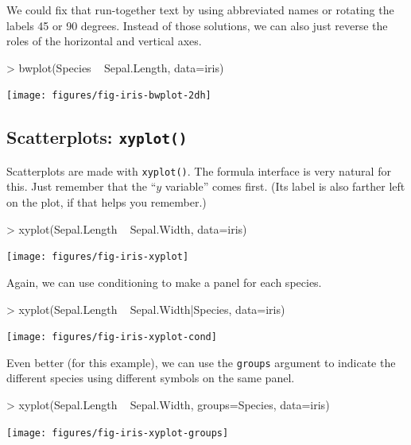 We could fix that run-together text by using abbreviated names or rotating the
labels 45 or 90 degrees.  Instead of those solutions, we can also just reverse the roles
of the horizontal and vertical axes.
\begin{center}
\begin{Schunk}
\begin{Sinput}
> bwplot(Species ~ Sepal.Length, data=iris)
\end{Sinput}
\end{Schunk}
\texttt{[image: figures/fig-iris-bwplot-2dh]}
\end{center}

\vspace{-12mm}


\subsection{Scatterplots: \texttt{xyplot()}}

Scatterplots are made with \verb!xyplot()!.  The formula interface is very natural for this.  
Just remember that the ``$y$ variable'' comes first.  (Its label is also farther left on 
the plot, if that helps you remember.)
\begin{center}
\begin{Schunk}
\begin{Sinput}
> xyplot(Sepal.Length ~ Sepal.Width, data=iris)
\end{Sinput}
\end{Schunk}
\texttt{[image: figures/fig-iris-xyplot]}
\end{center}

Again, we can use conditioning to make a panel for each species.
\begin{center}
\begin{Schunk}
\begin{Sinput}
> xyplot(Sepal.Length ~ Sepal.Width|Species, data=iris)
\end{Sinput}
\end{Schunk}
\texttt{[image: figures/fig-iris-xyplot-cond]}
\end{center}


Even better (for this example), we can use the \verb!groups! argument to indicate the different species using
different symbols on the same panel.
\begin{center}
\begin{Schunk}
\begin{Sinput}
> xyplot(Sepal.Length ~ Sepal.Width, groups=Species, data=iris)
\end{Sinput}
\end{Schunk}
\texttt{[image: figures/fig-iris-xyplot-groups]}
\end{center}

